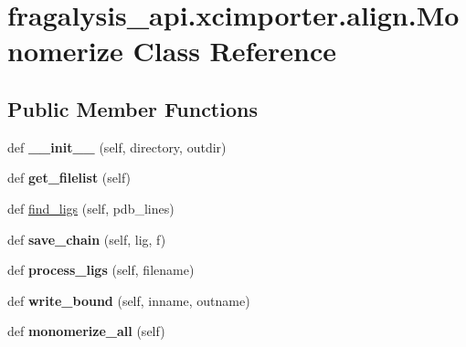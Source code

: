 \hypertarget{classfragalysis__api_1_1xcimporter_1_1align_1_1_monomerize}{}\section{fragalysis\+\_\+api.\+xcimporter.\+align.\+Monomerize Class Reference}
\label{classfragalysis__api_1_1xcimporter_1_1align_1_1_monomerize}
\subsection*{Public Member Functions}
\begin{DoxyCompactItemize}
\item 
\mbox{\label{classfragalysis__api_1_1xcimporter_1_1align_1_1_monomerize_ab3b407ab1e80bd20413390da2e92bc45}} 
def {\bfseries \+\_\+\+\_\+init\+\_\+\+\_\+} (self, directory, outdir)
\item 
\mbox{\label{classfragalysis__api_1_1xcimporter_1_1align_1_1_monomerize_ae400c1aa47fa3a5fe32a3ade3f601582}} 
def {\bfseries get\+\_\+filelist} (self)
\item 
def \hyperlink{classfragalysis__api_1_1xcimporter_1_1align_1_1_monomerize_a95bebe718abd76f9546c67db4a1848b3}{find\+\_\+ligs} (self, pdb\+\_\+lines)
\item 
\mbox{\label{classfragalysis__api_1_1xcimporter_1_1align_1_1_monomerize_a7dc86cd770a6c7532e96b0f45d91dc2b}} 
def {\bfseries save\+\_\+chain} (self, lig, f)
\item 
\mbox{\label{classfragalysis__api_1_1xcimporter_1_1align_1_1_monomerize_a182c0cf1af3303f6c13d5160c6c0ff8e}} 
def {\bfseries process\+\_\+ligs} (self, filename)
\item 
\mbox{\label{classfragalysis__api_1_1xcimporter_1_1align_1_1_monomerize_aa97d5e71f2d0309e12bc4beafa5151fc}} 
def {\bfseries write\+\_\+bound} (self, inname, outname)
\item 
\mbox{\label{classfragalysis__api_1_1xcimporter_1_1align_1_1_monomerize_a2418993e78b9269ecc5d4222a142261c}} 
def {\bfseries monomerize\+\_\+all} (self)
\end{DoxyCompactItemize}
